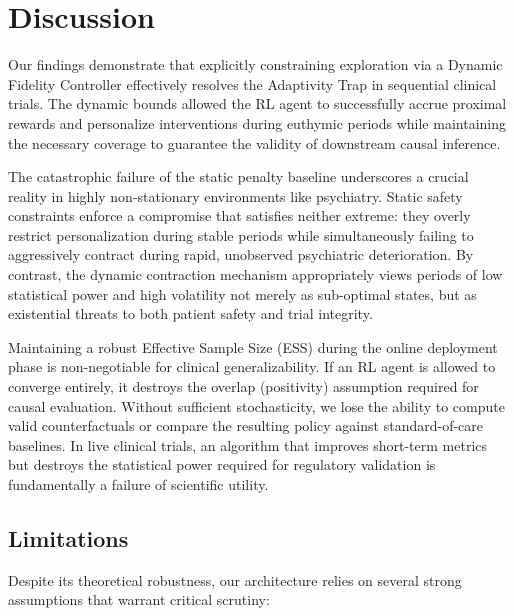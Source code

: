 \section{Discussion}

Our findings demonstrate that explicitly constraining exploration via a Dynamic Fidelity Controller effectively resolves the Adaptivity Trap in sequential clinical trials. The dynamic bounds allowed the RL agent to successfully accrue proximal rewards and personalize interventions during euthymic periods while maintaining the necessary coverage to guarantee the validity of downstream causal inference.

The catastrophic failure of the static penalty baseline underscores a crucial reality in highly non-stationary environments like psychiatry. Static safety constraints enforce a compromise that satisfies neither extreme: they overly restrict personalization during stable periods while simultaneously failing to aggressively contract during rapid, unobserved psychiatric deterioration. By contrast, the dynamic contraction mechanism appropriately views periods of low statistical power and high volatility not merely as sub-optimal states, but as existential threats to both patient safety and trial integrity.

Maintaining a robust Effective Sample Size (ESS) during the online deployment phase is non-negotiable for clinical generalizability. If an RL agent is allowed to converge entirely, it destroys the overlap (positivity) assumption required for causal evaluation. Without sufficient stochasticity, we lose the ability to compute valid counterfactuals or compare the resulting policy against standard-of-care baselines. In live clinical trials, an algorithm that improves short-term metrics but destroys the statistical power required for regulatory validation is fundamentally a failure of scientific utility.

\subsection{Limitations}

Despite its theoretical robustness, our architecture relies on several strong assumptions that warrant critical scrutiny:


